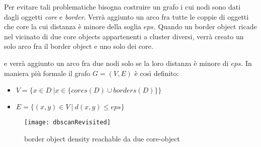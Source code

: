 Per evitare tali problematiche bisogna costruire un grafo i cui nodi sono dati dagli oggetti  \emph{core} e \emph{border}.
Verrà aggiunto un arco fra tutte le coppie di oggetti che core la cui distanza è minore della soglia $eps$.
Quando un border object ricade nel vicinato di due core objects appartenenti a cluster diversi, verrà creato un solo arco fra il border object e uno solo dei core.



 e verrà aggiunto un arco fra due nodi solo se la loro distanza è minore di $eps$.  In maniera più formale il grafo $
G=(V,E)$ è così definito:
\begin{itemize}
\item $ V= \lbrace x \in D \:| x \in \{ cores(D) \cup borders(D)\}\} $
\item 
 $ E = \lbrace (x,y) \in V \:| \: d(x,y) \le eps \rbrace$

\end{itemize}

\begin{figure}
\centering
\texttt{[image: dbscanRevisited]}
\caption{border object density reachable da due core-object}
\label{fig:dbscanGraphRevisited}
 \end{figure}
 
 


